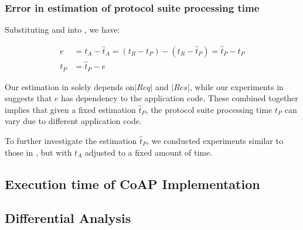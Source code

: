 \subsubsection{Error in estimation of protocol suite processing time}

Substituting  and  into , we have:

\begin{equation}\label{Eq: tP error}
	\begin{aligned}
		e &= t_A - \hat{t}_A = (t_R - t_P) - (t_R - \hat{t}_P) = \hat{t}_P - t_P\\
		t_P &= \hat{t}_P - e
	\end{aligned}
\end{equation}

Our estimation in  solely depends on$|Req|$ and $|Res|$, while our experiments in  suggests that $e$ has dependency to the application code. These combined together implies that given a fixed estimation $\hat{t}_P$, the protocol suite processing time $t_P$ can vary due to different application code.

To further investigate the estimation $\hat{t}_P$, we conducted experiments similar to those in , but with $t_A$ adjusted to a fixed amount of time.

\begin{figure}
	\center
	\caption{}
\end{figure}

\subsection{Execution time of CoAP Implementation}

\subsection{Differential Analysis}


